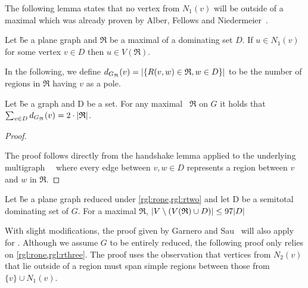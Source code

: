 \noindent The following lemma states that no vertex from $N_1(v)$ will be outside of a maximal \dreg which was already proven by Alber, Fellows and Niedermeier~\cite[Lemma 6]{Alber2004}.

\begin{lemma}\label{lemma:noneinside}
    Let \G be a plane graph and $\mathfrak{R}$ be a maximal \dreg of a dominating set $D$. If $u \in N_1(v)$ for some vertex $v \in D$ then $u \in V(\mathfrak{R})$.
\end{lemma}

In the following, we define $d_{G_{\mathfrak{R}}}(v) = \abs{\{R(v,w) \in \mathfrak{R}, w \in D\}}$ to be the number of regions in $\mathfrak{R}$ having $v$ as a pole. 

\begin{corollary}
    Let \G be a graph and D be a set. For any maximal \dreg~$\mathfrak{R}$ on $G$ it holds that $\sum_{v \in D} d_{G_{\mathfrak{R}}}(v) = 2 \cdot \abs{\mathfrak{R}}$.
\end{corollary}
\begin{proof}\label{lemma:polesBound}
    
    The proof follows directly from the handshake lemma applied to the underlying multigraph~\GR~ where every edge between $v,w \in D$ represents a region between $v$ and $w$ in $\mathfrak{R}$.
\end{proof}

\begin{proposition}\label{lemma:outside}
    Let \G be a plane graph reduced under \cref*{rgl:rone,rgl:rtwo} and let D be a semitotal dominating set of $G$. For a maximal \dreg $\mathfrak{R}$,  $\abs{V \setminus (V(\mathfrak{R}) \cup D)} \leq 97 \abs{D}$
\end{proposition}

With slight modifications, the proof given by Garnero and Sau~\cite[arXiv v2]{Garnero2018} will also apply for \sdom. Although we assume $G$ to be entirely reduced, the following proof only relies on \cref{rgl:rone,rgl:rthree}. The proof uses the observation that vertices from $N_2(v)$ that lie outside of a region must span simple regions between those from $\{v\} \cup N_1(v)$.


